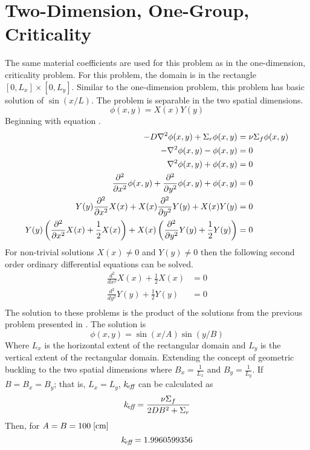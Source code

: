 \section{Two-Dimension, One-Group, Criticality}
  \label{sec:deriv_2d1g}
  The same material coefficients are used for this problem as in the 
  one-dimension, criticality problem. For this problem, the domain is in the 
  rectangle $[0,L_x]\times[0,L_y]$. Similar to the one-dimension problem, 
  this problem has basic solution of $\sin(x/L)$. The problem is separable in 
  the two spatial dimensions. 
  \begin{equation}
    \phi(x,y) = X(x) Y(y) 
  \end{equation}
  Beginning with equation .
  \begin{align}
    -D \mathbf{\nabla}^2 \phi(x,y) + \Sigma_r \phi(x,y) &= \nu \Sigma_f \phi(x,y) \\
    - \mathbf{\nabla}^2 \phi(x,y) - \phi(x,y) &= 0 \\
    \mathbf{\nabla}^2 \phi(x,y) + \phi(x,y) &= 0 \\
    \frac{\partial^2}{\partial x^2} \phi(x,y) + 
      \frac{\partial^2}{\partial y^2} \phi(x,y) +
      \phi(x,y) &= 0\\
    Y(y)\frac{\partial^2}{\partial x^2}X(x) +
      X(x) \frac{\partial^2}{\partial y^2} Y(y) + X(x)Y(y) &= 0\\
    Y(y)\left(\frac{\partial^2}{\partial x^2}X(x) + \frac{1}{2} X(x)\right)+
      X(x)\left(\frac{\partial^2}{\partial y^2}Y(y) + \frac{1}{2}Y(y)
      \right) &= 0
  \end{align}
  For non-trivial solutions $X(x) \ne 0$ and $Y(y) \ne 0$ then the following
  second order ordinary differential equations can be solved.
  \begin{align}
    \frac{d^2}{dx^2} X(x) + \frac{1}{2} X(x) &= 0 \\
    \frac{d^2}{dy^2} Y(y) + \frac{1}{2} Y(y) &= 0 \\
  \end{align}
  The solution to these problems is the product of the solutions from the 
  previous problem presented in . The solution is
  \begin{equation} \label{eq:analytic_2d1g}
    \phi(x,y) = \sin(x/A) \sin(y/B)
  \end{equation}
  Where $L_x$ is the horizontal extent of the rectangular domain and $L_y$ is 
  the vertical extent of the rectangular domain. Extending the concept of 
  geometric buckling to the two spatial dimensions where $B_x = \frac{1}{L_x}$
  and $B_y = \frac{1}{L_y}$. If $B=B_x=B_y$; that is, $L_x=L_y$, $k_{\!\mbox{\scriptsize \em eff}}$ can 
  be calculated as
  \begin{equation}
    k_{\!\mbox{\scriptsize \em eff}} = \frac{\nu \Sigma_f}{2DB^2 + \Sigma_r} 
  \end{equation}
  Then, for $A=B = 100 \;\text{[{cm}]}$
  \begin{equation}
    k_{\!\mbox{\scriptsize \em eff}} = 1.9960599356
  \end{equation}
  

